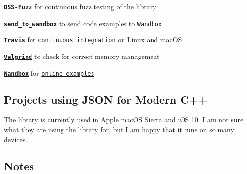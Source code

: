 \begin{DoxyItemize}
\item \href{https://github.com/google/oss-fuzz}{\tt {\bfseries O\+S\+S-\/\+Fuzz}} for continuous fuzz testing of the library
\item \href{https://github.com/nlohmann/json/blob/develop/doc/scripts/send_to_wandbox.py}{\tt {\bfseries send\+\_\+to\+\_\+wandbox}} to send code examples to \href{http://melpon.org/wandbox}{\tt Wandbox}
\item \href{https://travis-ci.org}{\tt {\bfseries Travis}} for \href{https://travis-ci.org/nlohmann/json}{\tt continuous integration} on Linux and mac\+OS
\item \href{http://valgrind.org}{\tt {\bfseries Valgrind}} to check for correct memory management
\item \href{http://melpon.org/wandbox}{\tt {\bfseries Wandbox}} for \href{http://melpon.org/wandbox/permlink/4NEU6ZZMoM9lpIex}{\tt online examples}
\end{DoxyItemize}

\subsection*{Projects using J\+S\+ON for Modern C++}

The library is currently used in Apple mac\+OS Sierra and i\+OS 10. I am not sure what they are using the library for, but I am happy that it runs on so many devices.

\subsection*{Notes}


